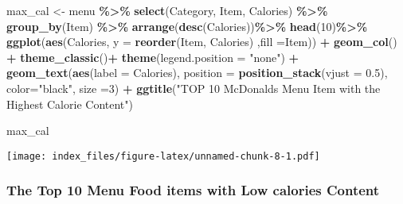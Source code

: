 \documentclass[
]{article}
\newenvironment{Shaded}{\begin{snugshade}}{\end{snugshade}}
\newcommand{\AttributeTok}[1]{\textcolor[rgb]{0.13,0.29,0.53}{#1}}
\newcommand{\DecValTok}[1]{\textcolor[rgb]{0.00,0.00,0.81}{#1}}
\newcommand{\FloatTok}[1]{\textcolor[rgb]{0.00,0.00,0.81}{#1}}
\newcommand{\FunctionTok}[1]{\textcolor[rgb]{0.13,0.29,0.53}{\textbf{#1}}}
\newcommand{\NormalTok}[1]{#1}
\newcommand{\OtherTok}[1]{\textcolor[rgb]{0.56,0.35,0.01}{#1}}
\newcommand{\SpecialCharTok}[1]{\textcolor[rgb]{0.81,0.36,0.00}{\textbf{#1}}}
\newcommand{\StringTok}[1]{\textcolor[rgb]{0.31,0.60,0.02}{#1}}
\begin{document}
\begin{Shaded}
\begin{Highlighting}[]
\NormalTok{max\_cal }\OtherTok{\textless{}{-}}\NormalTok{ menu }\SpecialCharTok{\%\textgreater{}\%} 
  \FunctionTok{select}\NormalTok{(Category,}
\NormalTok{         Item,}
\NormalTok{         Calories) }\SpecialCharTok{\%\textgreater{}\%} 
  \FunctionTok{group\_by}\NormalTok{(Item) }\SpecialCharTok{\%\textgreater{}\%} 
  \FunctionTok{arrange}\NormalTok{(}\FunctionTok{desc}\NormalTok{(Calories))}\SpecialCharTok{\%\textgreater{}\%} 
  \FunctionTok{head}\NormalTok{(}\DecValTok{10}\NormalTok{)}\SpecialCharTok{\%\textgreater{}\%} 
  \FunctionTok{ggplot}\NormalTok{(}\FunctionTok{aes}\NormalTok{(Calories,}
             \AttributeTok{y =} \FunctionTok{reorder}\NormalTok{(Item,}
\NormalTok{                         Calories)}
\NormalTok{             ,}\AttributeTok{fill =}\NormalTok{Item)) }\SpecialCharTok{+} 
  \FunctionTok{geom\_col}\NormalTok{() }\SpecialCharTok{+}
  \FunctionTok{theme\_classic}\NormalTok{()}\SpecialCharTok{+}
  \FunctionTok{theme}\NormalTok{(}\AttributeTok{legend.position =} \StringTok{"none"}\NormalTok{) }\SpecialCharTok{+} 
  \FunctionTok{geom\_text}\NormalTok{(}\FunctionTok{aes}\NormalTok{(}\AttributeTok{label =}\NormalTok{ Calories), }
            \AttributeTok{position =} \FunctionTok{position\_stack}\NormalTok{(}\AttributeTok{vjust =} \FloatTok{0.5}\NormalTok{),}
            \AttributeTok{color=}\StringTok{"black"}\NormalTok{, }\AttributeTok{size =}\DecValTok{3}\NormalTok{) }\SpecialCharTok{+} \FunctionTok{ggtitle}\NormalTok{(}\StringTok{"TOP 10 McDonald\textquotesingle{}s Menu Item with the Highest Calorie Content"}\NormalTok{)}

\NormalTok{max\_cal}
\end{Highlighting}
\end{Shaded}

\texttt{[image: index\_files/figure-latex/unnamed-chunk-8-1.pdf]}

\hypertarget{the-top-10-menu-food-items-with-low-calories-content}{%
\subsubsection{The Top 10 Menu Food items with Low calories
Content}\label{the-top-10-menu-food-items-with-low-calories-content}}
\end{document}
